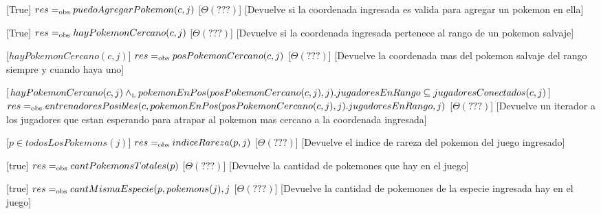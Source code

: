 \begin{Interfaz}
  [True]
  {$res =_{\mathrm{obs}} puedoAgregarPokemon(c,j)$}
  [$\Theta(???)$] 
  [Devuelve si la coordenada ingresada es valida para agregar un pokemon en ella]

  [True]
  {$res =_{\mathrm{obs}} hayPokemonCercano(c,j)$}
  [$\Theta(???)$] 
  [Devuelve si la coordenada ingresada pertenece al rango de un pokemon salvaje]   

  [$hayPokemonCercano(c,j)$]
  {$res =_{\mathrm{obs}} posPokemonCercano(c,j)$}
  [$\Theta(???)$] %
  [Devuelve la coordenada mas del pokemon salvaje del rango siempre y cuando haya uno]   

  [$hayPokemonCercano(c,j) \land_{\mathrm{\scriptscriptstyle{L}}} pokemonEnPos(posPokemonCercano(c,j),j).jugadoresEnRango \subseteq jugadoresConectados(c,j)$]
  {$res =_{\mathrm{obs}} entrenadoresPosibles(c,pokemonEnPos(posPokemonCercano(c,j),j).jugadoresEnRango,j)$}
  [$\Theta(???)$] 
  [Devuelve un iterador a los jugadores que estan esperando para atrapar al pokemon mas cercano a la coordenada ingresada]   

  [$p \in todosLosPokemons(j)$]
  {$res =_{\mathrm{obs}} indiceRareza(p,j)$}
  [$\Theta(???)$] 
  [Devuelve el indice de rareza del pokemon del juego ingresado]

  [true]
  {$res =_{\mathrm{obs}} cantPokemonsTotales(p)$}
  [$\Theta(???)$] 
  [Devuelve la cantidad de pokemones que hay en el juego]

  [true]
  {$res =_{\mathrm{obs}} cantMismaEspecie(p, pokemons(j), j$}
  [$\Theta(???)$] 
  [Devuelve la cantidad de pokemones de la especie ingresada hay en el juego]

  
\end{Interfaz}

